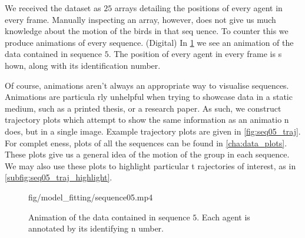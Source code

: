 We received the dataset as $25$ arrays detailing the positions of every agent in every frame. Manually 
inspecting an array, however, does not give us much knowledge about the motion of the birds in that seq
uence. To counter this we produce animations of every sequence. (Digital) In \cref{anim:sequence05} we 
see an animation of the data contained in sequence $5$. The position of every agent in every frame is s
hown, along with its identification number.

Of course, animations aren't always an appropriate way to visualise sequences. Animations are particula
rly unhelpful when trying to showcase data in a static medium, such as a printed thesis, or a research 
paper. As such, we construct trajectory plots which attempt to show the same information as an animatio
n does, but in a single image. Example trajectory plots are given in \cref{fig:seq05_traj}. For complet
eness, plots of all the sequences can be found in \cref{cha:data_plots}. These plots give us a general 
idea of the motion of the group in each sequence. We may also use these plots to highlight particular t
rajectories of interest, as in \cref{subfig:seq05_traj_highlight}. 

\begin{figure}[!tbp]

				 {\textwidth}{\textwidth}{fig/model_fitting/sequence05.mp4}
	\vspace{-190pt}
	\caption{Animation of the data contained in sequence $5$. Each agent is annotated by its identifying n
umber.}
	\label{anim:sequence05}
\end{figure}

